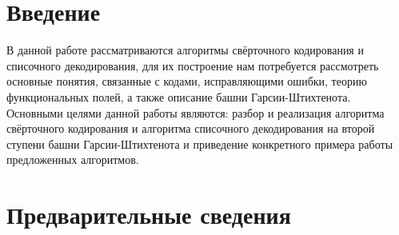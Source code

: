 \documentclass{article}
\def\tilde{\widetilde}
\def\epsilon{\varepsilon}
\def\n{\hfill\break} \def\al{\alpha} \def\be{\beta} \def\ga{\gamma} \def\Ga{\Gamma} \def\ro{\rho}\def\de{\delta} \def\si{\sigma}
\def\om{\omega} \def\Om{\Omega} \def\ka{\kappa} \def\la{\lambda} \def\La{\Lambda}
\def\de{\delta} \def\De{\Delta} \def\vph{\varphi} \def\vep{\varepsilon} \def\th{\theta}
\def\Th{\Theta} \def\vth{\vartheta} \def\sg{\sigma} \def\Sg{\Sigma}\def\ups{\upsilon}\def\ups{\upsilon}
\def\bendproof{$\hfill \blacksquare$} \def\wendproof{$\hfill \square$}
\def\holim{\mathop{\rm holim}} \def\span{{\rm span}} \def\mod{{\rm mod}}
\def\rank{{\rm rank}} \def\bsl{{\backslash}}
\def\il{\int\limits} \def\pt{{\partial}} \def\lra{{\longrightarrow}}
\def\noth{\varnothing}
\def\pa{\partial }
\def\ra{\rightarrow }
\def\sm{\setminus }
\def\ss{\subset }
\def\ee{\epsilon }
\def\beq{\begin{equation}}
\def\eeq{\end{equation}}
\def\ov{\over}
\def\ti{\tilde}
\def\div{\mbox{div}}
\def\supp{\mbox{supp}}
\def\tr{\mbox{tr}}
\def\const{\mbox{const}}
\numberwithin{equation}{section}
\begin{document}
\tableofcontents %

\date{}

\def\n{\hfill\break} \def\al{\alpha} \def\be{\beta} \def\ga{\gamma} \def\Ga{\Gamma} \def\ro{\rho}\def\de{\delta} \def\si{\sigma} 
\def\om{\omega} \def\Om{\Omega} \def\ka{\kappa} \def\la{\lambda} \def\La{\Lambda}
\def\de{\delta} \def\De{\Delta} \def\vph{\varphi} \def\vep{\varepsilon} \def\th{\theta}
\def\Th{\Theta} \def\vth{\vartheta} \def\sg{\sigma} \def\Sg{\Sigma}\def\ups{\upsilon}\def\ups{\upsilon}
\def\bendproof{$\hfill \blacksquare$} \def\wendproof{$\hfill \square$}
\def\holim{\mathop{\rm holim}} \def\span{{\rm span}} \def\mod{{\rm mod}}
\def\rank{{\rm rank}} \def\bsl{{\backslash}}
\def\il{\int\limits} \def\pt{{\partial}} \def\lra{{\longrightarrow}}
\def\noth{\varnothing}
\def\pa{\partial } 
\def\ra{\rightarrow }
\def\sm{\setminus }
\def\ss{\subset }
\def\ee{\epsilon }
\def\beq{\begin{equation}}
\def\eeq{\end{equation}}
\def\ov{\over}
\def\ti{\tilde}
\def\div{\mbox{div}}
\def\supp{\mbox{supp}}
\def\tr{\mbox{tr}}
\def\const{\mbox{const}}

\newpage

\section{Введение}
В данной работе рассматриваются алгоритмы свёрточного кодирования и списочного декодирования, для их построение нам потребуется рассмотреть основные понятия, связанные с кодами, исправляющими ошибки, теорию функциональных полей, а также описание башни Гарсии-Штихтенота. \\
Основными целями данной работы являются: разбор и реализация алгоритма свёрточного кодирования и алгоритма списочного декодирования на второй ступени башни Гарсии-Штихтенота и приведение конкретного примера работы предложенных алгоритмов.
\bigskip


\section{Предварительные сведения}
\end{document}
